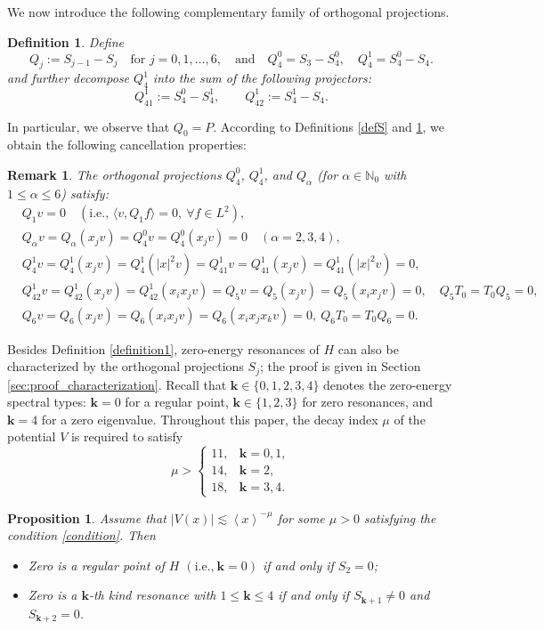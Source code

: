 \documentclass[reqno]{amsart}
\newtheorem{proposition}[theorem]{Proposition}
\newtheorem{definition}[theorem]{Definition}
\newtheorem{remark}[theorem]{Remark}
\numberwithin{equation}{section}
\begin{document}
We now introduce the following complementary family of orthogonal projections.
\begin{definition}\label{defQ}
Define
$$
	Q_j := S_{j-1} - S_j \quad \text{for } j = 0,1,\dots,6, \quad \text{and} \quad Q_4^0 = S_3 - S_4^0, \quad Q_4^1 = S_4^0 - S_4.
$$
and further decompose $Q_4^1$ into the sum of the following projectors:
$$
Q_{41}^1 := S_4^0 - S_4^1, \qquad Q_{42}^1 := S_4^1 - S_4. 
$$
\end{definition}
In particular, we observe that $Q_0=P.$
According to Definitions \ref{defS} and \ref{defQ}, we obtain the following cancellation properties:
\begin{remark}\label{cancellationQ}
	The orthogonal projections $Q_4^0$, $Q_4^1$, and $Q_\alpha$ (for $\alpha \in \mathbb{N}_0$ with $1 \le \alpha \le 6$) satisfy:
	\begin{align*}
		& Q_{1}v = 0 \quad (\text{i.e., } \langle v, Q_{1}f \rangle = 0,\ \forall f \in L^2), \\
		& Q_{\alpha}v = Q_{\alpha}(x_jv) =Q_{4}^{0}v = Q_{4}^{0}(x_jv) =  0 \quad (\alpha = 2,3,4), \\
		& Q_{4}^{1}v = Q_{4}^{1}(x_jv )= Q_{4}^{1}(|x|^2v )= Q_{41}^{1}v = Q_{41}^{1}(x_jv )= Q_{41}^{1}(|x|^2v )= 0,   \\
        & Q_{42}^{1}v = Q_{42}^{1}(x_jv )= Q_{42}^{1}(x_ix_jv )=Q_{5}v = Q_{5}(x_jv) = Q_{5}(x_ix_jv) = 0,\quad Q_5T_0=T_0Q_5=0,\\
		& Q_{6}v = Q_{6}(x_jv) = Q_{6}(x_ix_jv) = Q_{6}(x_ix_jx_kv) = 0,\ Q_6T_0=T_0Q_6=0.
	\end{align*}
\end{remark}

 Besides Definition \ref{definition1}, zero-energy resonances of $H$ can also be characterized by the orthogonal projections $S_j$; the proof is given in Section \ref{sec:proof_characterization}. Recall that $\mathbf{k} \in \{0,1,2,3,4\}$  denotes  the zero-energy spectral types: $\mathbf{k}=0$ for a regular point, $\mathbf{k} \in \{1,2,3\}$ for zero resonances, and $\mathbf{k}=4$ for a zero eigenvalue. 
Throughout this paper, the decay index $\mu$ of the potential $V$ is required to satisfy 
\begin{equation}\label{condition}
	\mu> \begin{cases}11, & \mathbf{k}=0,1, \\
14, &  \mathbf{k}=2,\\
18, & \mathbf{k}=3,4. \end{cases}
		\end{equation}
\begin{proposition}\label{characterizations}
Assume that $\left|V(x)\right| \lesssim \left \langle  x\right \rangle^{-\mu}$ for some $\mu>0$
satisfying the condition \eqref{condition}.
Then 
\begin{itemize}
\item[(i)] Zero  is a regular point of $H$  $( \text{i.e.,}\  \mathbf{k}=0 )$  if and only if $S_{2}=0$;
\item[(ii)] Zero is a $\mathbf{k}$-th kind resonance with $1\leq\mathbf{k}\le 4$ if and only if  $S_{\mathbf{k}+1} \neq 0$ and $S_{\mathbf{k}+2}=0$.
\end{itemize}
\end{proposition}
\end{document}
